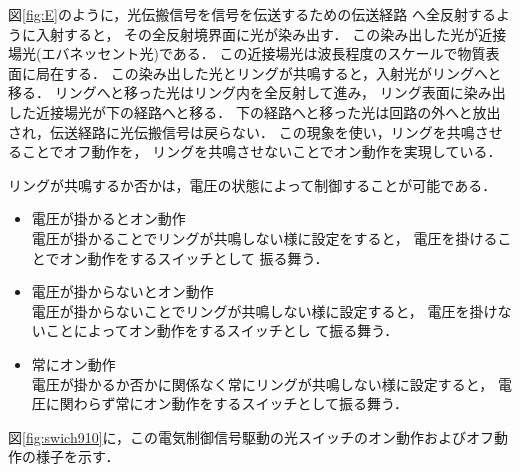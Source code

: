 図\ref{fig:E}のように，光伝搬信号を信号を伝送するための伝送経路
へ全反射するように入射すると，
その全反射境界面に光が染み出す．
この染み出した光が近接場光(エバネッセント光)である．
この近接場光は波長程度のスケールで物質表面に局在する．
この染み出した光とリングが共鳴すると，入射光がリングへと移る．
リングへと移った光はリング内を全反射して進み，
リング表面に染み出した近接場光が下の経路へと移る．
下の経路へと移った光は回路の外へと放出され，伝送経路に光伝搬信号は戻らない．
この現象を使い，リングを共鳴させることでオフ動作を，
リングを共鳴させないことでオン動作を実現している．

リングが共鳴するか否かは，電圧の状態によって制御することが可能である．
\begin{itemize}
\item 電圧が掛かるとオン動作\\
電圧が掛かることでリングが共鳴しない様に設定をすると，
電圧を掛けることでオン動作をするスイッチとして
振る舞う．
\item 電圧が掛からないとオン動作\\
電圧が掛からないことでリングが共鳴しない様に設定すると，
電圧を掛けないことによってオン動作をするスイッチとし
て振る舞う．
\item 常にオン動作\\
電圧が掛かるか否かに関係なく常にリングが共鳴しない様に設定すると，
電圧に関わらず常にオン動作をするスイッチとして振る舞う．
\end{itemize}
図\ref{fig:swich910}に，この電気制御信号駆動の光スイッチのオン動作およびオフ動作の様子を示す．
